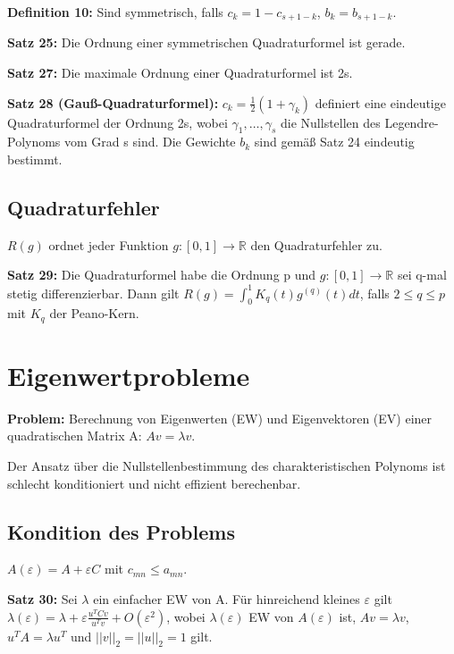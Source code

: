 \documentclass[a4paper]{article}
\begin{document}
\textbf{Definition 10:} Sind symmetrisch, falls $c_k = 1 - c_{s + 1 -k}$, 
\hspace{1em}
$b_k = b_{s + 1 - k}$.

\textbf{Satz 25:} Die Ordnung einer symmetrischen Quadraturformel ist gerade.

\textbf{Satz 27:} Die maximale Ordnung einer Quadraturformel ist 2s.

\textbf{Satz 28 (Gauß-Quadraturformel):} $c_k = \frac{1}{2} (1 + \gamma_k)$
definiert eine eindeutige Quadraturformel der Ordnung 2s, wobei $\gamma_1,
\dots, \gamma_s$ die Nullstellen des Legendre-Polynoms vom Grad s sind. Die
Gewichte $b_k$ sind gemäß Satz 24 eindeutig bestimmt.

\subsection{Quadraturfehler}

$R(g)$ ordnet jeder Funktion $g: [0, 1] \to \mathbb{R}$ den Quadraturfehler zu.

\vspace{1em}

\textbf{Satz 29:} Die Quadraturformel habe die Ordnung p und $g : [0, 1] \to
\mathbb{R}$ sei q-mal stetig differenzierbar. Dann gilt $R(g) = \int_0^1 K_q(t)
g^{(q)} (t) dt$, falls $2 \le q \le p$ mit $K_q$ der Peano-Kern.

\section{Eigenwertprobleme}

\textbf{Problem:} Berechnung von Eigenwerten (EW) und Eigenvektoren (EV) einer
quadratischen Matrix A: $Av = \lambda v$.

Der Ansatz über die Nullstellenbestimmung des charakteristischen Polynoms ist
schlecht konditioniert und nicht effizient berechenbar.

\subsection{Kondition des Problems}

$A(\varepsilon) = A + \varepsilon C$ mit $c_{mn} \le a_{mn}$.

\textbf{Satz 30:} Sei $\lambda$ ein einfacher EW von A. Für hinreichend kleines
$\varepsilon$ gilt $\lambda(\varepsilon) = \lambda +  \varepsilon \frac{u^{T} C
v}{u^{T} v} + O(\varepsilon^2)$, wobei $\lambda(\varepsilon)$ EW von
$A(\varepsilon)$ ist, $Av = \lambda v$, $u^T A = \lambda u^T$ und $||v||_2 =
||u||_2 = 1$ gilt. 
\end{document}

